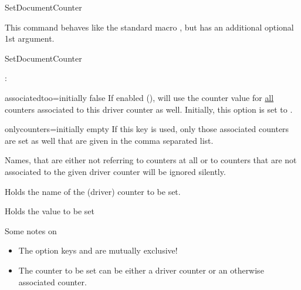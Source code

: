 \documentclass[12pt,a4paper,oneside]{article}
\def\packageversion{\xassoccntpackageversion}%
\begin{document}
\begin{docCommand}{SetDocumentCounter}{}

This command behaves like the standard macro , but has an additional optional 1st argument. %

\begin{docCommandArgs}{SetDocumentCounter}%


\begin{codeoptionsenum}
  \item {}: %

    \begin{docKey}{associatedtoo}{=}{initially false}
      If enabled (),  will use the counter value for \underline{all} counters associated to this driver counter as well. Initially, this option is set to . 
    \end{docKey}
    
    \begin{docKey}{onlycounters}{=}{initially empty}
      If this key is used, only those associated counters are set as well that are given in the comma separated list. 
      
      Names, that are either not referring to counters at all or to counters that are not associated to the given driver counter will be ignored silently. 
    \end{docKey}

   



  \item {} 
    Holds the name of the (driver) counter to be set. 
  \item {}
    Holds the value to be set 
  \end{codeoptionsenum}
\end{docCommandArgs}

Some notes on 
\begin{itemize}
    \item The option keys  and  are mutually exclusive! %
    \item The counter to be set can be either a driver counter or an otherwise associated counter. 
\end{itemize}
\end{docCommand}%
\end{document}
